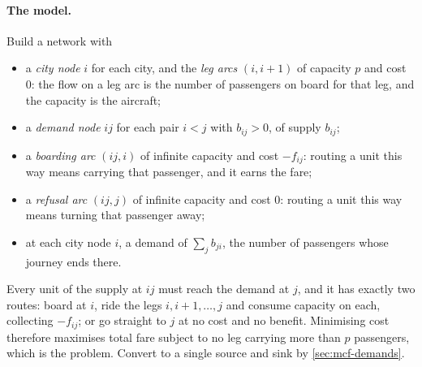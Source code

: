 \paragraph{The model.}
Build a network with
\begin{itemize}[leftmargin=*]
  \item a \emph{city node} $i$ for each city, and the \emph{leg arcs}
        $(i, i+1)$ of capacity $p$ and cost $0$: the flow on a leg arc is the
        number of passengers on board for that leg, and the capacity is the
        aircraft;
  \item a \emph{demand node} $ij$ for each pair $i<j$ with $b_{ij} > 0$, of
        supply $b_{ij}$;
  \item a \emph{boarding arc} $(ij, i)$ of infinite capacity and cost
        $-f_{ij}$: routing a unit this way means carrying that passenger, and
        it earns the fare;
  \item a \emph{refusal arc} $(ij, j)$ of infinite capacity and cost $0$:
        routing a unit this way means turning that passenger away;
  \item at each city node $i$, a demand of $\sum_{j} b_{ji}$, the number of
        passengers whose journey ends there.
\end{itemize}
Every unit of the supply at $ij$ must reach the demand at $j$, and it has
exactly two routes: board at $i$, ride the legs $i, i+1, \ldots, j$ and consume
capacity on each, collecting $-f_{ij}$; or go straight to $j$ at no cost and no
benefit. Minimising cost therefore maximises total fare subject to no leg
carrying more than $p$ passengers, which is the problem. Convert to a single
source and sink by \cref{sec:mcf-demands}.

